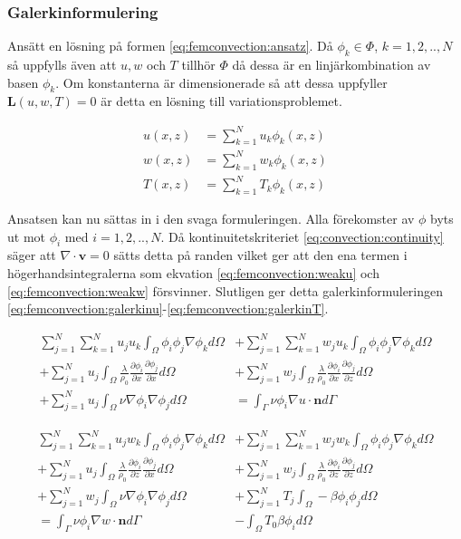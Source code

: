 \subsubsection{Galerkinformulering}

Ansätt en lösning på formen \eqref{eq:femconvection:ansatz}.
Då $\phi_k \in \Phi$, $k=1,2,..,N$ så uppfylls även att $u,w$ och $T$ tillhör
$\Phi$ då dessa är en linjärkombination av basen $\phi_k$. Om konstanterna
är dimensionerade så att dessa uppfyller $\mathbf{L}(u,w,T) = 0$ är detta
en lösning till variationsproblemet. \cite{johnson2009}\cite{heath2002}\cite{lewis04}

\begin{align}
u(x,z) &= \sum^N_{k=1}u_k\phi_k(x,z)
\nonumber \\
w(x,z) &= \sum^N_{k=1}w_k\phi_k(x,z)
\nonumber \\
T(x,z) &= \sum^N_{k=1}T_k\phi_k(x,z)
\label{eq:femconvection:ansatz}
\end{align}

\noindent
Ansatsen kan nu sättas in i den svaga formuleringen.
Alla förekomster av $\phi$ byts ut mot $\phi_i$ med $i=1,2,..,N$. Då
kontinuitetskriteriet \eqref{eq:convection:continuity} säger att
$\nabla\cdot\mathbf{v} = 0$ sätts detta på randen vilket ger att den
ena termen i högerhandsintegralerna som ekvation \eqref{eq:femconvection:weaku} och
\eqref{eq:femconvection:weakw}
försvinner. Slutligen ger
detta galerkinformuleringen
\eqref{eq:femconvection:galerkinu}-\eqref{eq:femconvection:galerkinT}.

\begin{align}
\label{eq:femconvection:galerkinu}
\sum^N_{j=1}\sum^N_{k=1}u_ju_k\int_\Omega \phi_i\phi_j\nabla\phi_k d\Omega &+
\sum^N_{j=1}\sum^N_{k=1}w_ju_k\int_\Omega \phi_i\phi_j\nabla\phi_k d\Omega  \\ +
\nonumber
\sum^N_{j=1} u_j\int_\Omega\frac{\lambda}{\rho_0}\frac{\partial \phi_i}{\partial x}\frac{\partial \phi_j}{\partial x} d\Omega &+
\sum^N_{j=1} w_j\int_\Omega\frac{\lambda}{\rho_0}\frac{\partial \phi_i}{\partial x}\frac{\partial \phi_j}{\partial z} d\Omega  \\ +
\nonumber
\sum^N_{j=1} u_j \int_\Omega \nu\nabla\phi_i\nabla\phi_j d\Omega &=
\int_\Gamma \nu\phi_i\nabla u \cdot \mathbf{n} d\Gamma
\end{align}

\begin{align}
\label{eq:femconvection:galerkinw}
\sum^N_{j=1}\sum^N_{k=1}u_jw_k\int_\Omega \phi_i\phi_j\nabla\phi_k d\Omega &+
\sum^N_{j=1}\sum^N_{k=1}w_jw_k\int_\Omega \phi_i\phi_j\nabla\phi_k d\Omega \\ +
\nonumber
\sum^N_{j=1} u_j\int_\Omega \frac{\lambda}{\rho_0}\frac{\partial \phi_i}{\partial z}\frac{\partial \phi_j}{\partial x} d\Omega &+
\sum^N_{j=1} w_j\int_\Omega \frac{\lambda}{\rho_0}\frac{\partial \phi_i}{\partial z}\frac{\partial \phi_j}{\partial z} d\Omega \\ +
\nonumber
\sum^N_{j=1} w_j \int_\Omega \nu\nabla\phi_i\nabla\phi_j d\Omega &+
\sum^N_{j=1}T_j \int_\Omega - \beta\phi_i\phi_j d\Omega \\
\nonumber
= \int_\Gamma \nu\phi_i\nabla w \cdot \mathbf{n} d\Gamma &- \int_\Omega T_0\beta\phi_id\Omega
\end{align}

